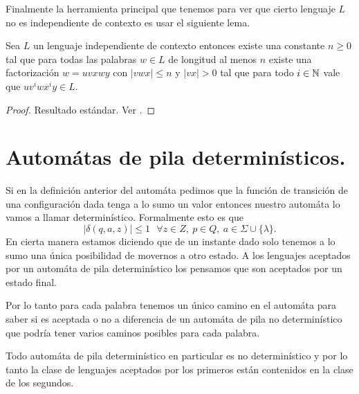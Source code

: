 \documentclass[tesis.tex]{subfiles}
\newcommand{\ic}{independiente de contexto }
\newcommand{\APND}{automáta de pila no determinístico }
\newcommand{\APD}{automáta de pila determinístico }
\begin{document}
Finalmente la herramienta principal que tenemos para ver que cierto lenguaje $L$ no es \ic es usar el siguiente lema.

\begin{lema}[Pumping] \label{pumping}
	Sea $L$ un lenguaje independiente de contexto entonces existe una constante $n \ge 0$ tal que para todas las palabras $w \in L$ de longitud al menos $n$ existe una factorización $w = uvxwy$ con $|vwx| \le n$ y $|vx| > 0$ tal que para todo $i \in \mathbb{N}$ vale que $uv^iwx^iy \in L$.
\end{lema}

\begin{proof}
	Resultado estándar. Ver \cite{hopcraft-ullman}.
\end{proof}

\section{Automátas de pila determinísticos.} Si en la definición anterior del automáta pedimos que la función de transición de una configuración dada tenga a lo sumo un valor entonces nuestro automáta lo vamos a llamar determinístico. Formalmente esto es que 
\[
|\delta(q,a, z)| \le 1 \ \ \ \forall z \in Z, \ p \in Q, \ a \in \Sigma \cup \{ \lambda \}.
\]
En cierta manera estamos diciendo que de un instante dado solo tenemos a lo sumo una única posibilidad de movernos a otro estado. A los lenguajes aceptados por un \APD los pensamos que son aceptados por un estado final.


 Por lo tanto para cada palabra tenemos un único camino en el automáta para saber si es aceptada o no a diferencia de un \APND  que podría tener varios caminos posibles para cada palabra.
\begin{obs}
	Todo \APD en particular es no determinístico y por lo tanto la clase de lenguajes aceptados por los primeros están contenidos en la clase de los segundos.
\end{obs}
\end{document}
